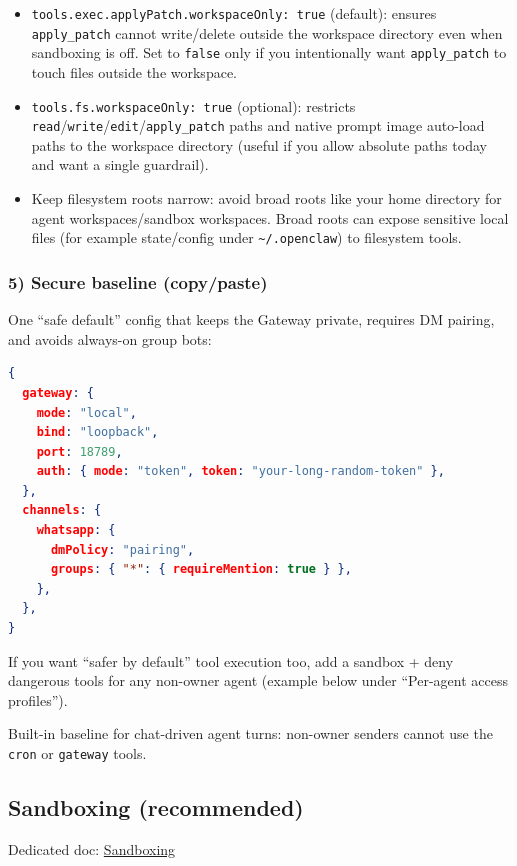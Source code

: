 \begin{itemize}
  \item \texttt{tools.exec.applyPatch.workspaceOnly: true} (default): ensures \texttt{apply\_patch} cannot write/delete outside the workspace directory even when sandboxing is off. Set to \texttt{false} only if you intentionally want \texttt{apply\_patch} to touch files outside the workspace.
  \item \texttt{tools.fs.workspaceOnly: true} (optional): restricts \texttt{read}/\texttt{write}/\texttt{edit}/\texttt{apply\_patch} paths and native prompt image auto-load paths to the workspace directory (useful if you allow absolute paths today and want a single guardrail).
  \item Keep filesystem roots narrow: avoid broad roots like your home directory for agent workspaces/sandbox workspaces. Broad roots can expose sensitive local files (for example state/config under \texttt{\textasciitilde{}/.openclaw}) to filesystem tools.
\end{itemize}


\subsubsection{5) Secure baseline (copy/paste)}


One “safe default” config that keeps the Gateway private, requires DM pairing, and avoids always-on group bots:

\begin{lstlisting}[language=json]
{
  gateway: {
    mode: "local",
    bind: "loopback",
    port: 18789,
    auth: { mode: "token", token: "your-long-random-token" },
  },
  channels: {
    whatsapp: {
      dmPolicy: "pairing",
      groups: { "*": { requireMention: true } },
    },
  },
}
\end{lstlisting}


If you want “safer by default” tool execution too, add a sandbox + deny dangerous tools for any non-owner agent (example below under “Per-agent access profiles”).

Built-in baseline for chat-driven agent turns: non-owner senders cannot use the \texttt{cron} or \texttt{gateway} tools.

\subsection{Sandboxing (recommended)}


Dedicated doc: \href{/gateway/sandboxing}{Sandboxing}

